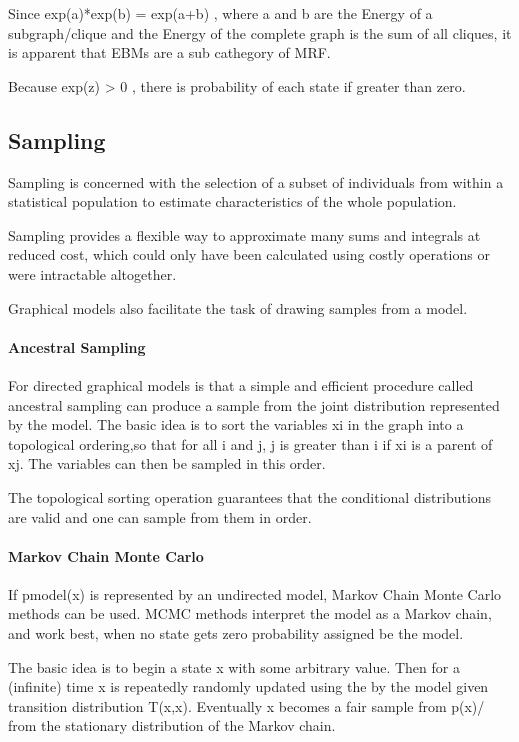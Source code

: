 Since exp(a)*exp(b) = exp(a+b) , where a and b are the Energy of a subgraph/clique and the Energy of the complete graph is the sum of all cliques, it is apparent that EBMs are a sub cathegory of MRF.  

Because exp(z) > 0 , there is probability of each state if greater than zero. 

\subsection{Sampling}

Sampling is concerned with the selection of a subset of individuals from within a statistical population to estimate characteristics of the whole population.

Sampling provides a flexible way to approximate many sums and integrals at reduced cost, which could only have been calculated using costly operations or were intractable altogether.  

Graphical models also facilitate the task of drawing samples from a model.

\paragraph{Ancestral Sampling} For directed graphical models is that a simple and efficient procedure called ancestral sampling can produce a sample from the joint distribution represented by the model. 
The basic idea is to sort the variables xi in the graph into a topological ordering,so that for all i and j, j is greater than i if xi is a parent of xj. The variables can then be sampled in this order.

 The topological sorting operation guarantees that the conditional distributions are valid and one can sample from them in order.

\paragraph{Markov Chain Monte Carlo} If pmodel(x) is represented by an undirected model, Markov Chain Monte Carlo methods can be used. 
MCMC methods interpret the model as a Markov chain, and work best, when no state gets zero probability assigned be the model.

The basic idea is to begin a state x with some arbitrary value. 
Then for a (infinite) time x is repeatedly randomly updated using the by the model given transition distribution T(x,x). 
Eventually x becomes a fair sample from p(x)/ from the stationary distribution of the Markov chain.

